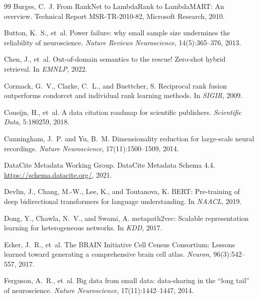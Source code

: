 \documentclass{article}
\theoremstyle{definition}
\begin{document}
\begin{thebibliography}{99}
Burges, C.~J.
\newblock From RankNet to LambdaRank to LambdaMART: An overview.
\newblock Technical Report MSR-TR-2010-82, Microsoft Research, 2010.

Button, K.~S., et~al.
\newblock Power failure: why small sample size undermines the reliability of neuroscience.
\newblock \emph{Nature Reviews Neuroscience}, 14(5):365--376, 2013.

Chen, J., et~al.
\newblock Out-of-domain semantics to the rescue! Zero-shot hybrid retrieval.
\newblock In \emph{EMNLP}, 2022.

Cormack, G.~V., Clarke, C.~L., and Buettcher, S.
\newblock Reciprocal rank fusion outperforms condorcet and individual rank learning methods.
\newblock In \emph{SIGIR}, 2009.

Cousijn, H., et~al.
\newblock A data citation roadmap for scientific publishers.
\newblock \emph{Scientific Data}, 5:180259, 2018.

Cunningham, J.~P. and Yu, B.~M.
\newblock Dimensionality reduction for large-scale neural recordings.
\newblock \emph{Nature Neuroscience}, 17(11):1500--1509, 2014.

DataCite Metadata Working Group.
\newblock DataCite Metadata Schema 4.4.
\newblock \url{https://schema.datacite.org/}, 2021.

Devlin, J., Chang, M.-W., Lee, K., and Toutanova, K.
\newblock BERT: Pre-training of deep bidirectional transformers for language understanding.
\newblock In \emph{NAACL}, 2019.

Dong, Y., Chawla, N.~V., and Swami, A.
\newblock metapath2vec: Scalable representation learning for heterogeneous networks.
\newblock In \emph{KDD}, 2017.

Ecker, J.~R., et~al.
\newblock The BRAIN Initiative Cell Census Consortium: Lessons learned toward generating a comprehensive brain cell atlas.
\newblock \emph{Neuron}, 96(3):542--557, 2017.

Ferguson, A.~R., et~al.
\newblock Big data from small data: data-sharing in the ``long tail'' of neuroscience.
\newblock \emph{Nature Neuroscience}, 17(11):1442--1447, 2014.


\end{thebibliography}
\end{document}
